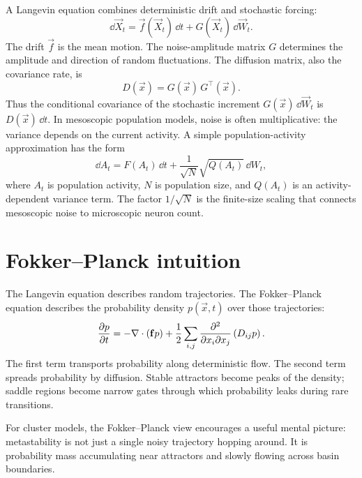 A Langevin equation combines deterministic drift and stochastic forcing:
%
\begin{equation}
  \dd\vec{X}_t =
  \vec{f}(\vec{X}_t)\,\dd t
  + G(\vec{X}_t)\,\dd\vec{W}_t.
  \label{eq:langevin-general}
\end{equation}
%
The drift $\vec{f}$ is the mean motion. The noise-amplitude matrix $G$ determines the amplitude and direction of random fluctuations. The diffusion matrix, also the covariance rate, is
%
\begin{equation}
  D(\vec{x}) = G(\vec{x})\,G^\top(\vec{x}).
  \label{eq:ch19-diffusion-matrix}
\end{equation}
%
Thus the conditional covariance of the stochastic increment $G(\vec{x})\,\dd\vec{W}_t$ is $D(\vec{x})\,\dd t$.
%
In mesoscopic population models, noise is often multiplicative: the variance depends on the current activity. A simple population-activity approximation has the form
%
\begin{equation}
  \dd A_t = F(A_t)\,\dd t
  + \frac{1}{\sqrt{N}}\sqrt{Q(A_t)}\,\dd W_t,
  \label{eq:population-activity-langevin}
\end{equation}
%
where $A_t$ is population activity, $N$ is population size, and $Q(A_t)$ is an activity-dependent variance term. The factor $1/\sqrt{N}$ is the finite-size scaling that connects mesoscopic noise to microscopic neuron count.

\section{Fokker--Planck intuition}
\label{sec:fokker-planck-intuition}

The Langevin equation describes random trajectories. The Fokker--Planck equation describes the probability density $p(\vec{x},t)$ over those trajectories:
%
\begin{equation}
  \frac{\partial p}{\partial t}
  =
  -\nabla\cdot(\mathbf{f}p)
  + \frac{1}{2}\sum_{i,j}
  \frac{\partial^2}{\partial x_i\partial x_j}
  \left(D_{ij}p\right).
  \label{eq:fokker-planck}
\end{equation}
%
The first term transports probability along deterministic flow. The second term spreads probability by diffusion. Stable attractors become peaks of the density; saddle regions become narrow gates through which probability leaks during rare transitions.

For cluster models, the Fokker--Planck view encourages a useful mental picture: metastability is not just a single noisy trajectory hopping around. It is probability mass accumulating near attractors and slowly flowing across basin boundaries.

